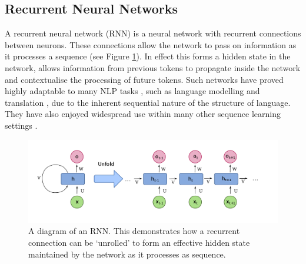 
\subsection{Recurrent Neural Networks} %
\label{sub:recurrent_neural_networks}

A recurrent neural network (RNN) is a neural network with recurrent connections between neurons. These connections allow the network to pass on information as it processes a sequence (see Figure \ref{fig:unrolled_lstm}). In effect this forms a hidden state in the network,  allows information from previous tokens to propagate inside the network and contextualise the processing of future tokens.
Such networks have proved highly adaptable to many NLP tasks \citep{young_recent_2017}, such as language modelling \citep{t._mikolov_extensions_2011} and translation \citep{liu_recursive_2014}, due to the inherent sequential nature of the structure of language. They have also enjoyed widespread use within many other sequence learning settings \citep{lipton_critical_2015} .

\begin{figure}[h]
    \centering
    \includegraphics[width=.9\linewidth]{ModelPics/rnn_wiki.png}
    \caption{A diagram of an RNN. This demonstrates how a recurrent connection can be `unrolled' to form an effective hidden state maintained by the network as it processes as sequence.  }
    \label{fig:unrolled_lstm}
\end{figure}

